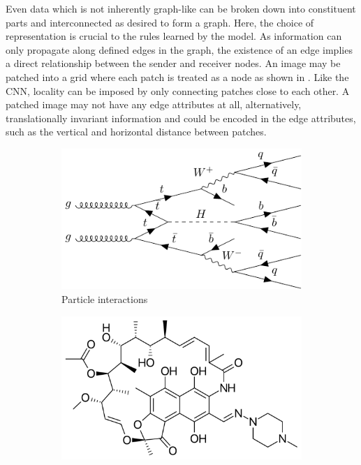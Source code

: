 Even data which is not inherently graph-like can be broken down into constituent parts and interconnected as desired to form a graph.
Here, the choice of representation is crucial to the rules learned by the model.
As information can only propagate along defined edges in the graph, the existence of an edge implies a direct relationship between the sender and receiver nodes.
An image may be patched into a grid where each patch is treated as a node as shown in .
Like the CNN, locality can be imposed by only connecting patches close to each other.
A patched image may not have any edge attributes at all, alternatively, translationally invariant information and could be encoded in the edge attributes, such as the vertical and horizontal distance between patches.

\begin{figure}
    \centering
    \begin{subfigure}[b]{0.45\textwidth}
        \centering
        \includegraphics[width=\textwidth]{Feynman/tth.pdf}
        \caption{Particle interactions}
        \label{fig:feynman}
    \end{subfigure}
    \begin{subfigure}[b]{0.45\textwidth}
        \centering
        \includegraphics[width=\textwidth]{Figures/transformers/Rifampicin_structure.pdf}

\end{subfigure}
\end{figure}
